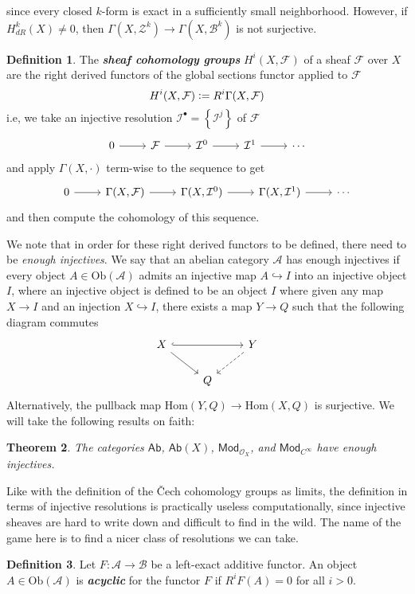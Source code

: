 \documentclass[psamsfonts, 12pt]{amsart}
\newtheorem{thm}{Theorem}[section]
\theoremstyle{definition}
\newtheorem{defn}[thm]{Definition}
\theoremstyle{remark}
\renewcommand{\hom}{\mathrm{Hom}}
\renewcommand{\O}{\mathcal{O}}
\newcommand{\ib}[1]{\textbf{\textit{#1}}}
\newcommand{\set}[1]{\left\lbrace #1 \right\rbrace}
\newcommand{\defeq}{\vcentcolon=}
\begin{document}
since every closed $k$-form is exact in a sufficiently small neighborhood. However,
if $H^k_{dR}(X) \neq 0$, then $\Gamma(X,\mathcal{Z}^k) \to \Gamma(X, \mathcal{B}^k)$
is not surjective.
%
\begin{defn}
The \ib{sheaf cohomology groups} $H^i(X, \mathcal{F})$ of a sheaf $\mathcal{F}$ over $X$
are the right derived functors of the global sections functor applied to $\mathcal{F}$
\[
H^i(X,\mathcal{F}) \defeq R^i\Gamma(X,\mathcal{F})
\]
i.e, we take an injective resolution $\mathcal{I}^\bullet = \set{\mathcal{I}^j}$ of
$\mathcal{F}$
\[\begin{tikzcd}
0 \ar[r] & \mathcal{F} \ar[r] & \mathcal{I}^0 \ar[r] & \mathcal{I}^1 \ar[r] & \cdots
\end{tikzcd}\]
and apply $\Gamma(X,\cdot)$ term-wise to the sequence to get
\[\begin{tikzcd}
0 \ar[r] & \Gamma(X,\mathcal{F}) \ar[r] & \Gamma(X,\mathcal{I}^0) \ar[r]
& \Gamma(X,\mathcal{I}^1) \ar[r] & \cdots
\end{tikzcd}\]
and then compute the cohomology of this sequence.
\end{defn}
%
We note that in order for these right derived functors to be defined, there need to
be \emph{enough injectives}. We say that an abelian category $\mathcal{A}$ has enough
injectives if every object $A \in \mathrm{Ob}(\mathcal{A})$ admits an injective
map $A \hookrightarrow I$ into an injective object $I$, where an injective object
is defined to be an object $I$ where given any map $X \to I$ and an injection
$X \hookrightarrow I$, there exists a map $Y \to Q$ such that the following diagram
commutes
\[\begin{tikzcd}
X \ar[dr]\ar[rr,hookrightarrow] & & Y \ar[dl, dashed] \\
& Q
\end{tikzcd}\]
Alternatively, the pullback map $\hom(Y,Q) \to \hom(X,Q)$ is surjective. We will take
the following results on faith:
%
\begin{thm}
The categories $\mathsf{Ab}$, $\mathsf{Ab}(X)$, $\mathsf{Mod}_{\O_X}$,
and $\mathsf{Mod}_{C^\infty}$ have
enough injectives.
\end{thm}
%
Like with the definition of the \v{C}ech cohomology groups as limits, the
definition in terms of injective resolutions is practically useless computationally,
since injective sheaves are hard to write down and difficult to find in the wild.
The name of the game here is to find a nicer class of resolutions we can take.
%
\begin{defn}
Let $F : \mathcal{A} \to \mathcal{B}$ be a left-exact additive functor. An object
$A \in \mathrm{Ob}(\mathcal{A})$ is \ib{acyclic} for the functor $F$ if
$R^iF(A) = 0$ for all $i > 0$.
\end{defn}
\end{document}
